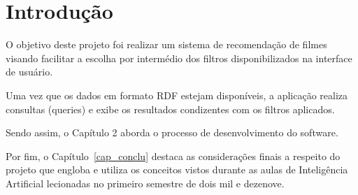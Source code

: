 \chapter{Introdução}\label{cap_intro}

 O objetivo deste projeto foi realizar um sistema de recomendação de filmes visando facilitar a escolha por intermédio dos filtros disponibilizados na interface de usuário.

Uma vez que os dados em formato RDF estejam disponíveis, a aplicação realiza consultas (queries) e exibe os resultados condizentes com os filtros aplicados.

Sendo assim, o Capítulo 2 aborda o processo de desenvolvimento do software.

Por fim, o Capítulo~\ref{cap_conclu} destaca as considerações finais a respeito do projeto que engloba e utiliza os conceitos vistos durante as aulas de Inteligência Artificial lecionadas no primeiro semestre de dois mil e dezenove.
